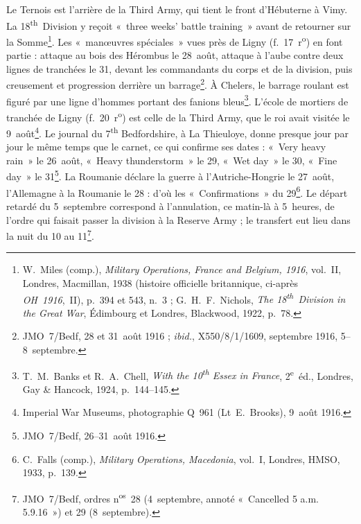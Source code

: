 Le Ternois est l'arrière de la Third Army, qui tient le front d'Hébuterne à Vimy. La 18\textsuperscript{th}~Division y reçoit «~three weeks' battle training~» avant de retourner sur la Somme\footnote{W.~Miles (comp.), \textit{Military Operations, France and Belgium, 1916}, vol.~II, Londres, Macmillan, 1938 (histoire officielle britannique, ci-après \textit{OH~1916},~II), p.~394 et 543, n.~3 ; G.~H.~F.~Nichols, \textit{The 18\textsuperscript{th}~Division in the Great War}, Édimbourg et Londres, Blackwood, 1922, p.~78.}. Les «~manœuvres spéciales~» vues près de Ligny (f.~17~r\textsuperscript{o}) en font partie : attaque au bois des Hérombus le 28~août, attaque à l'aube contre deux lignes de tranchées le 31, devant les commandants du corps et de la division, puis creusement et progression derrière un barrage\footnote{JMO~7/Bedf, 28 et 31~août 1916 ; \textit{ibid.}, X550/8/1/1609, septembre 1916, 5--8~septembre.}. À Chelers, le barrage roulant est figuré par une ligne d'hommes portant des fanions bleus\footnote{T.~M.~Banks et R.~A.~Chell, \textit{With the 10\textsuperscript{th} Essex in France}, 2\textsuperscript{e}~éd., Londres, Gay \& Hancock, 1924, p.~144--145.}. L'école de mortiers de tranchée de Ligny (f.~20~r\textsuperscript{o}) est celle de la Third Army, que le roi avait visitée le 9~août\footnote{Imperial War Museums, photographie Q~961 (Lt~E.~Brooks), 9~août 1916.}. Le journal du 7\textsuperscript{th} Bedfordshire, à La Thieuloye, donne presque jour par jour le même temps que le carnet, ce qui confirme ses dates : «~Very heavy rain~» le 26~août, «~Heavy thunderstorm~» le 29, «~Wet day~» le 30, «~Fine day~» le 31\footnote{JMO~7/Bedf, 26--31~août 1916.}. La Roumanie déclare la guerre à l'Autriche-Hongrie le 27~août, l'Allemagne à la Roumanie le 28 : d'où les «~Confirmations~» du 29\footnote{C.~Falls (comp.), \textit{Military Operations, Macedonia}, vol.~I, Londres, HMSO, 1933, p.~139.}. Le départ retardé du 5~septembre correspond à l'annulation, ce matin-là à 5~heures, de l'ordre qui faisait passer la division à la Reserve Army ; le transfert eut lieu dans la nuit du 10 au 11\footnote{JMO~7/Bedf, ordres n\textsuperscript{os}~28 (4~septembre, annoté «~Cancelled 5 a.m. 5.9.16~») et 29 (8~septembre).}.

